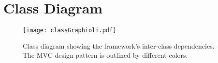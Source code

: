 \section{Class Diagram}

\begin{figure}[h]
	\centering
	\texttt{[image: classGraphioli.pdf]}
	\caption{Class diagram showing the framework's inter-class dependencies. The \gls{MVC} design pattern is outlined by different colors.}
	\label{img:classGraphioli}
\end{figure}